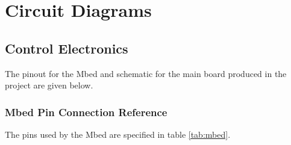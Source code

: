 \chapter{Circuit Diagrams}
	
	\section{Control Electronics}
		\label{sec:mainboardDiagrams}
		
		The pinout for the Mbed and schematic for the main board produced in the
		project are given below.
		
		\subsection{Mbed Pin Connection Reference}
			
			The pins used by the Mbed are specified in table \ref{tab:mbed}.
			
